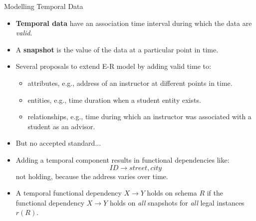 \documentclass{beamer}
\begin{document}
\begin{frame}{Modelling Temporal Data}
    \footnotesize
    \begin{itemize}
        \item \textbf{Temporal data} have an association time interval during which the data are \textit{valid}.
        \item A \textbf{snapshot} is the value of the data at a particular point in time.
        \item Several proposals to extend E-R model by adding valid time to:
            \begin{itemize}
                \footnotesize
                \item attributes, e.g., address of an instructor at different points in time.
                \item entities, e.g., time duration when a student entity exists.
                \item relationships, e.g., time during which an instructor was associated with a student as an advisor.
            \end{itemize}
        \item But no accepted standard...
        \item Adding a temporal component results in functional dependencies like:
            $$
                ID \rightarrow street, city
            $$
            not holding, because the address varies over time.
        \item A temporal functional dependency $X \rightarrow Y$ holds on schema $R$ if the functional dependency $X \longrightarrow Y$ holds on \textit{all} snapshots for \textit{all} legal instances $r(R)$.
    \end{itemize}
\end{frame}
\end{document}
